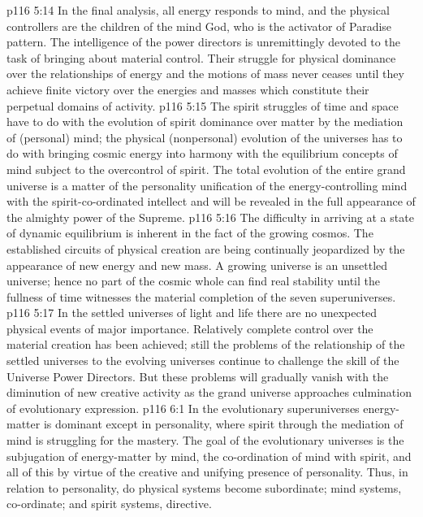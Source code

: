 \vs p116 5:14 \pc In the final analysis, all energy responds to mind, and the physical controllers are the children of the mind God, who is the activator of Paradise pattern. The intelligence of the power directors is unremittingly devoted to the task of bringing about material control. Their struggle for physical dominance over the relationships of energy and the motions of mass never ceases until they achieve finite victory over the energies and masses which constitute their perpetual domains of activity.
\vs p116 5:15 The spirit struggles of time and space have to do with the evolution of spirit dominance over matter by the mediation of (personal) mind; the physical (nonpersonal) evolution of the universes has to do with bringing cosmic energy into harmony with the equilibrium concepts of mind subject to the overcontrol of spirit. The total evolution of the entire grand universe is a matter of the personality unification of the energy\hyp{}controlling mind with the spirit\hyp{}co\hyp{}ordinated intellect and will be revealed in the full appearance of the almighty power of the Supreme.
\vs p116 5:16 The difficulty in arriving at a state of dynamic equilibrium is inherent in the fact of the growing cosmos. The established circuits of physical creation are being continually jeopardized by the appearance of new energy and new mass. A growing universe is an unsettled universe; hence no part of the cosmic whole can find real stability until the fullness of time witnesses the material completion of the seven superuniverses.
\vs p116 5:17 In the settled universes of light and life there are no unexpected physical events of major importance. Relatively complete control over the material creation has been achieved; still the problems of the relationship of the settled universes to the evolving universes continue to challenge the skill of the Universe Power Directors. But these problems will gradually vanish with the diminution of new creative activity as the grand universe approaches culmination of evolutionary expression.
\vs p116 6:1 In the evolutionary superuniverses energy\hyp{}matter is dominant except in personality, where spirit through the mediation of mind is struggling for the mastery. The goal of the evolutionary universes is the subjugation of energy\hyp{}matter by mind, the co\hyp{}ordination of mind with spirit, and all of this by virtue of the creative and unifying presence of personality. Thus, in relation to personality, do physical systems become subordinate; mind systems, co\hyp{}ordinate; and spirit systems, directive.
